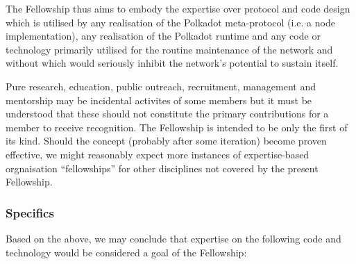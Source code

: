 \documentclass[9pt,oneside]{amsart}
\makeatletter
\newcommand*\ie{i.e.\@\xspace}
\makeatother
\begin{document}
The Fellowship thus aims to embody the expertise over protocol and code design which is utilised by any realisation of the Polkadot meta-protocol (\ie a node implementation), any realisation of the Polkadot runtime and any code or technology primarily utilised for the routine maintenance of the network and without which would seriously inhibit the network's potential to sustain itself.

Pure research, education, public outreach, recruitment, management and mentorship may be incidental activites of some members but it must be understood that these should not constitute the primary contributions for a member to receive recognition. The Fellowship is intended to be only the first of its kind. Should the concept (probably after some iteration) become proven effective, we might reasonably expect more instances of expertise-based orgnaisation ``fellowships'' for other disciplines not covered by the present Fellowship.

\subsubsection{Specifics}

Based on the above, we may conclude that expertise on the following code and technology would be considered a goal of the Fellowship:
\end{document}
